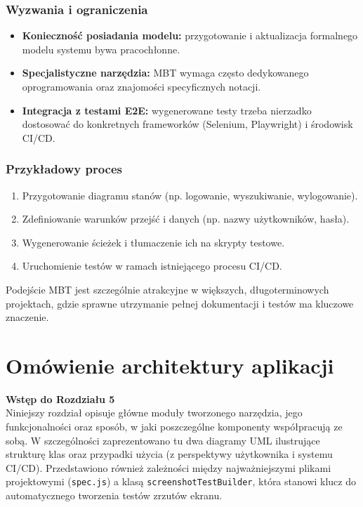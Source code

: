 \documentclass[12pt]{report}
\begin{document}
\subsection*{Wyzwania i ograniczenia}
\begin{itemize}
    \item \textbf{Konieczność posiadania modelu:} przygotowanie i aktualizacja formalnego modelu systemu bywa pracochłonne.
    \item \textbf{Specjalistyczne narzędzia:} MBT wymaga często dedykowanego oprogramowania oraz znajomości specyficznych notacji.
    \item \textbf{Integracja z testami E2E:} wygenerowane testy trzeba nierzadko dostosować do konkretnych frameworków (Selenium, Playwright) i środowisk CI/CD.
\end{itemize}

\subsection*{Przykładowy proces}
\begin{enumerate}
    \item Przygotowanie diagramu stanów (np. logowanie, wyszukiwanie, wylogowanie).
    \item Zdefiniowanie warunków przejść i danych (np. nazwy użytkowników, hasła).
    \item Wygenerowanie ścieżek i tłumaczenie ich na skrypty testowe.
    \item Uruchomienie testów w ramach istniejącego procesu CI/CD.
\end{enumerate}

Podejście MBT jest szczególnie atrakcyjne w większych, długoterminowych projektach, gdzie sprawne utrzymanie pełnej dokumentacji i testów ma kluczowe znaczenie.


\chapter{Omówienie architektury aplikacji}
\label{chap:omowienie-architektury}

\noindent\textbf{Wstęp do Rozdziału 5}\\
Niniejszy rozdział opisuje główne moduły tworzonego narzędzia, jego funkcjonalności oraz sposób, w jaki poszczególne komponenty współpracują ze sobą. W szczególności zaprezentowano tu dwa diagramy UML ilustrujące strukturę klas oraz przypadki użycia (z perspektywy użytkownika i systemu CI/CD). Przedstawiono również zależności między najważniejszymi plikami projektowymi (\texttt{spec.js}) a klasą \texttt{screenshotTestBuilder}, która stanowi klucz do automatycznego tworzenia testów zrzutów ekranu.
\end{document}
